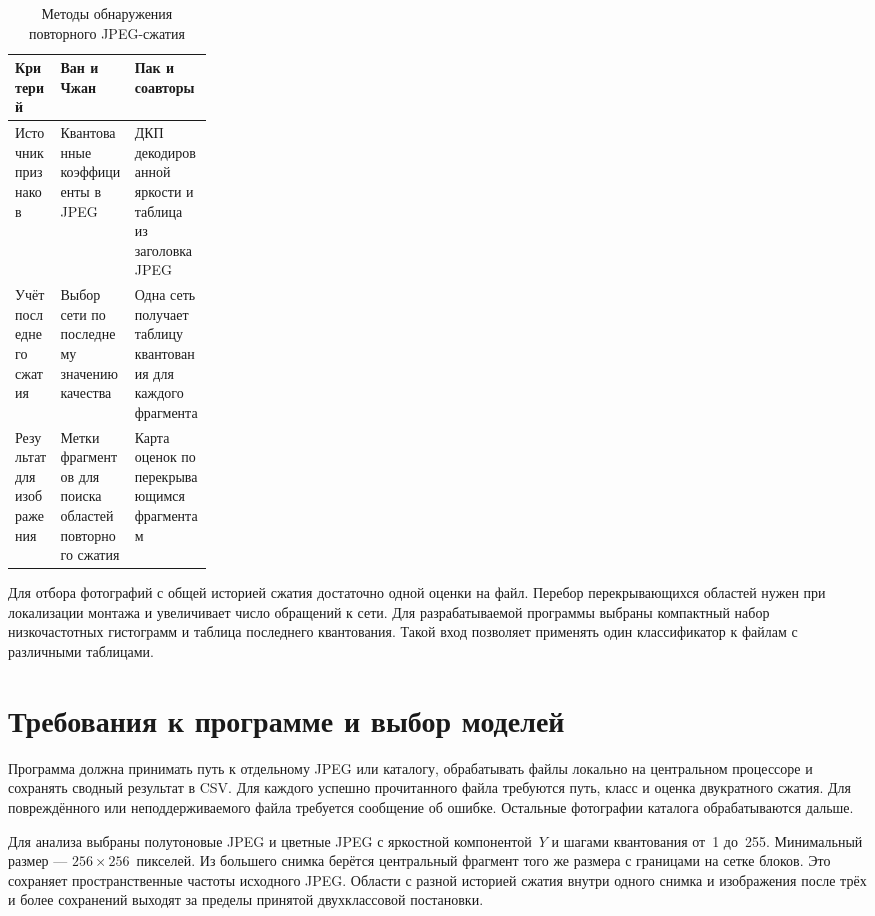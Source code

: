\begin{table}[htbp]
  \caption{Методы обнаружения повторного JPEG-сжатия}
  \label{tab:analogues}
  \centering\small\singlespacing
  \begin{tabularx}{\linewidth}{@{}p{0.23\linewidth}XX@{}}
    \toprule
    Критерий & Ван и Чжан & Пак и соавторы \\
    \midrule
    Источник признаков & Квантованные коэффициенты в JPEG & ДКП декодированной яркости и таблица из заголовка JPEG \\
    Учёт последнего сжатия & Выбор сети по последнему значению качества & Одна сеть получает таблицу квантования для каждого фрагмента \\
    Результат для изображения & Метки фрагментов для поиска областей повторного сжатия & Карта оценок по перекрывающимся фрагментам \\
    \bottomrule
  \end{tabularx}
\end{table}

Для отбора фотографий с общей историей сжатия достаточно одной оценки на файл. Перебор перекрывающихся областей нужен при локализации монтажа и увеличивает число обращений к сети. Для разрабатываемой программы выбраны компактный набор низкочастотных гистограмм и таблица последнего квантования. Такой вход позволяет применять один классификатор к файлам с различными таблицами.

\section{Требования к программе и выбор моделей}

Программа должна принимать путь к отдельному JPEG или каталогу, обрабатывать файлы локально на центральном процессоре и сохранять сводный результат в CSV. Для каждого успешно прочитанного файла требуются путь, класс и оценка двукратного сжатия. Для повреждённого или неподдерживаемого файла требуется сообщение об ошибке. Остальные фотографии каталога обрабатываются дальше.

Для анализа выбраны полутоновые JPEG и цветные JPEG с яркостной компонентой~$Y$ и шагами квантования от~1 до~255. Минимальный размер --- $256\times256$~пикселей. Из большего снимка берётся центральный фрагмент того же размера с границами на сетке блоков. Это сохраняет пространственные частоты исходного JPEG. Области с разной историей сжатия внутри одного снимка и изображения после трёх и более сохранений выходят за пределы принятой двухклассовой постановки.

